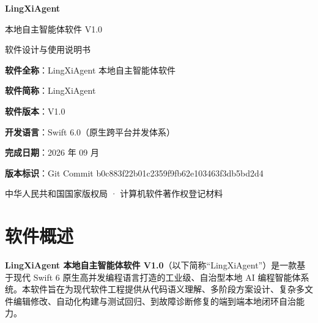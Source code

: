 \documentclass[11pt,a4paper]{article}
\begin{document}
\begin{titlepage}
    \centering
    \vspace*{28mm}
    {\fontsize{28pt}{34pt}\selectfont\heiti\bfseries LingXiAgent\par}
    \vspace{8mm}
    {\fontsize{20pt}{26pt}\selectfont\heiti 本地自主智能体软件 V1.0\par}
    \vspace{15mm}
    {\Large\kaishu 软件设计与使用说明书\par}
    \vspace{35mm}
    
    \begin{tcolorbox}[colback=gray!5,colframe=gray!40,width=0.88\textwidth,arc=3mm,center]
        \centering\large
        \vspace{3mm}
        \textbf{软件全称}：LingXiAgent 本地自主智能体软件\par\vspace{3mm}
        \textbf{软件简称}：LingXiAgent\par\vspace{3mm}
        \textbf{软件版本}：V1.0\par\vspace{3mm}
        \textbf{开发语言}：Swift 6.0（原生跨平台并发体系）\par\vspace{3mm}
        \textbf{完成日期}：2026 年 09 月\par\vspace{3mm}
        \textbf{版本标识}：Git Commit b0c883f22b01c2359f9fb62e103463f3db5bd2d4\par
        \vspace{3mm}
    \end{tcolorbox}
    
    \vfill
    {\large\songti 中华人民共和国国家版权局 · 计算机软件著作权登记材料\par}
    \vspace{15mm}
\end{titlepage}

\newpage
\tableofcontents
\newpage

\section{软件概述}

\textbf{LingXiAgent 本地自主智能体软件 V1.0}（以下简称“LingXiAgent”）是一款基于现代 Swift 6 原生高并发编程语言打造的工业级、自治型本地 AI 编程智能体系统。本软件旨在为现代软件工程提供从代码语义理解、多阶段方案设计、复杂多文件编辑修改、自动化构建与测试回归、到故障诊断修复的端到端本地闭环自治能力。
\end{document}
